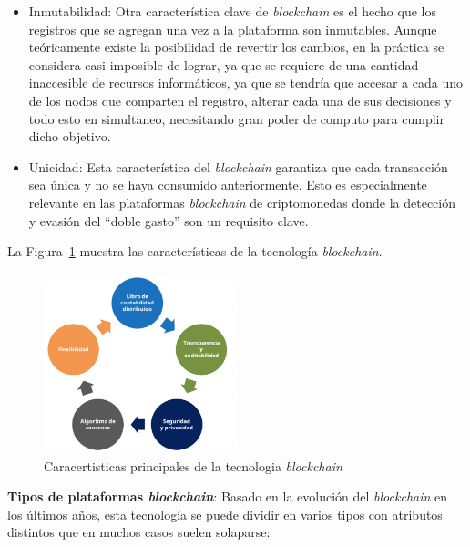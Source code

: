 \begin{itemize}
    \item Inmutabilidad: Otra característica clave de \textit{blockchain} es el hecho que los registros que se agregan una vez a la plataforma son inmutables. Aunque teóricamente existe la posibilidad de revertir los cambios, en la práctica se considera casi imposible de lograr, ya que se requiere de una cantidad inaccesible de recursos informáticos, ya que se tendría que accesar a cada uno de los nodos que comparten el registro, alterar cada una de sus decisiones y todo esto en simultaneo, necesitando gran poder de computo para cumplir dicho objetivo.
    \item Unicidad: Esta característica del \textit{blockchain} garantiza que cada transacción sea única y no se haya consumido anteriormente. Esto es especialmente relevante en las plataformas \textit{blockchain} de criptomonedas donde la detección y  evasión  del “doble gasto” son un requisito clave.
\end{itemize}

La Figura~\ref{blockchain_properties} muestra las características de la tecnología \textit{blockchain}.

\begin{figure}[h]
    \centering
    \includegraphics[width=0.5\textwidth]{caracteristicas_blockchain.png}
     \caption{Caracertisticas principales de la tecnologia \textit{blockchain} }
    \label{blockchain_properties}
\end{figure}



\textbf{Tipos de plataformas \textit{blockchain}}:  Basado en la evolución del \textit{blockchain} en los últimos años, esta tecnología se puede dividir en varios tipos con atributos distintos que en muchos casos suelen solaparse:


